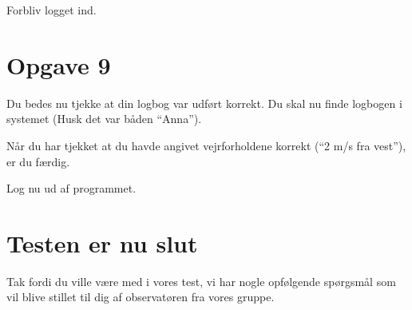 Forbliv logget ind.

\section{Opgave 9}

Du bedes nu tjekke at din logbog var udført korrekt.
Du skal nu finde logbogen i systemet (Husk det var båden ``Anna'').

Når du har tjekket at du havde angivet vejrforholdene korrekt (``2 m/s fra vest''), er du færdig.

Log nu ud af programmet.

\section{Testen er nu slut}

Tak fordi du ville være med i vores test, vi har nogle opfølgende spørgsmål som vil blive stillet til dig af observatøren fra vores gruppe.


